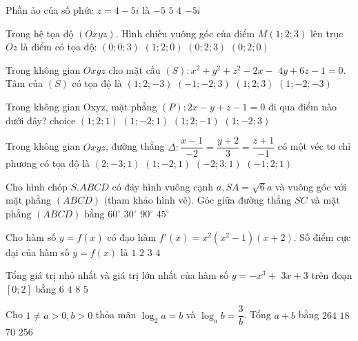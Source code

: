 \begin{ex}%
Phần ảo của số phức $z=4-5 i$ là
\choice
{\True $-5$}
{$5$}
{$4$}
{$-5 i$}

\end{ex}
\begin{ex}%
Trong hệ tọa độ $(O x y z)$. Hình chiếu vuông góc của điểm $M(1; 2; 3)$ lên trục $O z$ là điểm có tọa độ:
\choice
{\True $(0; 0; 3)$}
{$(1; 2; 0)$}
{$(0; 2; 3)$}
{$(0; 2; 0)$}

\end{ex}
\begin{ex}%
Trong không gian $O x y z$ cho mặt cầu $(S)\colon x^2+y^2+z^2-2 x-$ $4 y+6 z-1=0$. Tâm của $(S)$ có tọa độ là
\choice
{\True $(1; 2;-3)$}
{$(-1;-2; 3)$}
{$(1; 2; 3)$}
{$(1;-2;-3)$}

\end{ex}
\begin{ex}%
Trong không gian Oxyz, mặt phẳng $(P)\colon 2 x-y+z-1=0$ đi qua điểm nào dưới đây?
choice
{\True $(1; 2; 1)$}
{ $(1;-2; 1)$}
{ $(1; 2;-1)$}
{ $(1;-2; 3)$}

\end{ex}
\begin{ex}%
Trong không gian $O x y z$, đường thẳng $\Delta\colon \dfrac{x-1}{-2}=\dfrac{y+2}{3}=\dfrac{z+1}{-1}$ có một véc tơ chỉ phương có tọa độ là
\choice
{\True $(2;-3; 1)$}
{$(1;-2; 1)$}
{$(-2; 3; 1)$}
{$(-1; 2; 1)$}

\end{ex}
\begin{ex}%
Cho hình chóp $S.ABCD$ có đáy hình vuông cạnh $a, SA=\sqrt{6} a$ và vuông góc với mặt phẳng $(ABCD)$ (tham khảo hình vẽ). Góc giữa đường thẳng $SC$ và mặt phẳng $(ABCD)$ bằng
\choice
{\True $60^{\circ}$}
{$30^{\circ}$}
{$90^{\circ}$}
{$45^{\circ}$}

\end{ex}
\begin{ex}%
Cho hàm số $y=f(x)$ có đạo hàm $f'(x)=x^2\left(x^2-1\right)(x+2)$. Số điểm cực đại của hàm số $y=f(x)$ là
\choice
{\True $1$}
{$2$}
{$3$}
{$4$}

\end{ex}
\begin{ex}%
Tổng giá trị nhỏ nhất và giá trị lớn nhất của hàm số $y=-x^3+$ $3 x+3$ trên đoạn $[0; 2]$ bằng
\choice
{\True $6$}
{$4$}
{$8$}
{$5$}

\end{ex}
\begin{ex}%
Cho $1\neq a>0, b>0$ thỏa mãn $\log_2 a=b$ và $\log_a b=\dfrac{3}{b}$. Tổng $a+b$ bằng
\choice
{\True $264$}
{$18$}
{$70$}
{$256$}

\end{ex}

